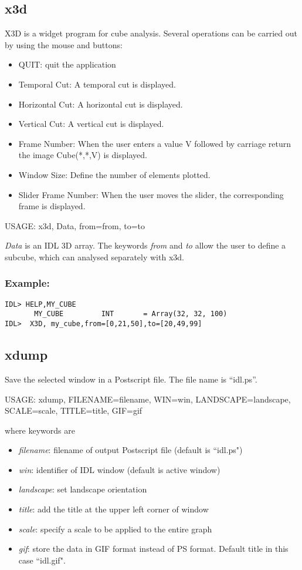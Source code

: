 \subsection{x3d}
X3D is a widget program for cube analysis. Several operations
can be carried out by using the mouse and buttons:
\begin{itemize}
\baselineskip=0.4truecm
\item  QUIT: quit the application
\item Temporal Cut: A temporal cut is displayed.
\item Horizontal Cut: A horizontal cut is displayed.
\item Vertical Cut: A vertical cut is displayed.
\item Frame Number: When the user enters a value V followed by carriage return
the image Cube(*,*,V) is displayed.
\item Window Size: Define the number of elements plotted.
\item Slider Frame Number: When the user moves the slider, 
the corresponding frame is displayed.
\end{itemize}

{\bf
\begin{center}
     USAGE: x3d, Data, from=from, to=to
\end{center}}
{\em Data} is an IDL 3D array. The keywords {\em from} and {\em to} allow
the user 
to define a subcube, which can analysed separately with x3d.
\subsubsection*{Example:}
\begin{verbatim}
IDL> HELP,MY_CUBE 
       MY_CUBE         INT       = Array(32, 32, 100)
IDL>  X3D, my_cube,from=[0,21,50],to=[20,49,99] 
\end{verbatim}

\subsection{xdump}
Save the selected window in a Postscript file. The file
name is ``idl.ps''. 
{\bf
\begin{center}
     USAGE: xdump, FILENAME=filename, WIN=win, LANDSCAPE=landscape, 
              SCALE=scale, TITLE=title, GIF=gif
\end{center}}
where keywords are
\begin{itemize}
\item {\em filename}: filename of output Postscript file (default is ``idl.ps")
\item {\em win}: identifier of IDL window (default is active window)
\item {\em landscape}: set landscape orientation
\item {\em title}: add the title at the upper left corner of window
\item {\em scale}: specify a scale to be applied to the entire graph
\item {\em gif}: store the data in GIF format instead of PS format.
 Default title in this case ``idl.gif".
\end{itemize}
 
